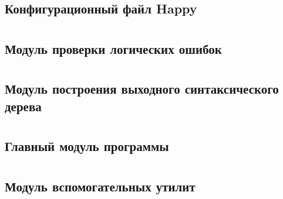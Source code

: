 \documentclass[a4paper,12pt]{report}
\numberwithin{equation}{section}
\begin{document}
\section*{} 
\subsection*{Конфигурационный файл Happy}

\clearpage

\section*{} 
\subsection*{Модуль проверки логических ошибок}

\clearpage

\section*{} 
\subsection*{Модуль построения выходного синтаксического дерева}

\clearpage

\section*{} 
\subsection*{Главный модуль программы}

\clearpage

\section*{} 
\subsection*{Модуль вспомогательных утилит}

\clearpage
\end{document}
